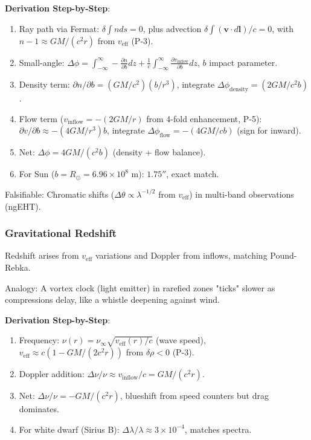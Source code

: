 \documentclass{article}
\begin{document}
\textbf{Derivation Step-by-Step}:
\begin{enumerate}
    \item Ray path via Fermat: $\delta \int n ds = 0$, plus advection $\delta \int (\mathbf{v} \cdot d\mathbf{l}) / c = 0$, with $n-1 \approx GM / (c^2 r)$ from $v_{\text{eff}}$ (P-3).
    \item Small-angle: $\Delta\phi = \int_{-\infty}^\infty -\frac{\partial n}{\partial b} dz + \frac{1}{c} \int_{-\infty}^\infty \frac{\partial v_{\text{inflow}}}{\partial b} dz$, $b$ impact parameter.
    \item Density term: $\partial n / \partial b = (GM / c^2) (b / r^3)$, integrate $\Delta\phi_{\text{density}} = (2 GM / c^2 b)$.
    \item Flow term ($v_{\text{inflow}} = - (2 GM / r)$ from 4-fold enhancement, P-5): $\partial v / \partial b \approx - (4 GM / r^3) b$, integrate $\Delta\phi_{\text{flow}} = - (4 GM / c b)$ (sign for inward).
    \item Net: $\Delta\phi = 4 GM / (c^2 b)$ (density + flow balance).
    \item For Sun ($b = R_\odot = 6.96 \times 10^8$ m): $1.75''$, exact match.
\end{enumerate}

Falsifiable: Chromatic shifts ($\Delta\theta \propto \lambda^{-1/2}$ from $v_{\text{eff}}$) in multi-band observations (ngEHT).

\subsubsection{Gravitational Redshift}

Redshift arises from $v_{\text{eff}}$ variations and Doppler from inflows, matching Pound-Rebka.

Analogy: A vortex clock (light emitter) in rarefied zones "ticks" slower as compressions delay, like a whistle deepening against wind.

\textbf{Derivation Step-by-Step}:
\begin{enumerate}
    \item Frequency: $\nu(r) = \nu_\infty \sqrt{v_{\text{eff}}(r) / c}$ (wave speed), $v_{\text{eff}} \approx c (1 - GM/(2 c^2 r))$ from $\delta\rho < 0$ (P-3).
    \item Doppler addition: $\Delta\nu / \nu \approx v_{\text{inflow}} / c = GM / (c^2 r)$.
    \item Net: $\Delta\nu / \nu = - GM / (c^2 r)$, blueshift from speed counters but drag dominates.
    \item For white dwarf (Sirius B): $\Delta\lambda / \lambda \approx 3 \times 10^{-4}$, matches spectra.
\end{enumerate}
\end{document}
